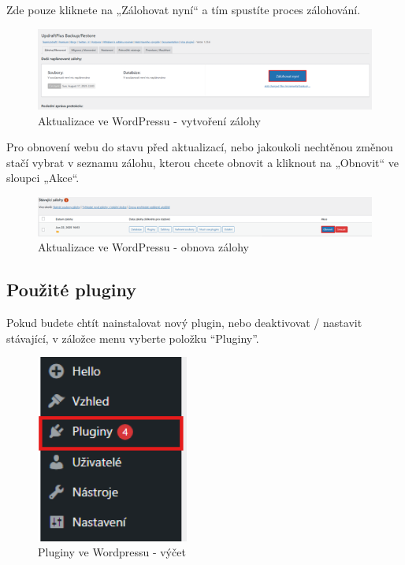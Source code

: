 \documentclass[12pt,a4paper]{article}
\begin{document}
	Zde pouze kliknete na „Zálohovat nyní“ a tím spustíte proces zálohování.
	
	\begin{figure}[htp]
		\centering
		\includegraphics[width=17cm]{WPmakebackup}
		\caption{Aktualizace ve WordPressu - vytvoření zálohy}
		\label{fig:role}
	\end{figure}
	
	Pro obnovení webu do stavu před aktualizací, nebo jakoukoli nechtěnou změnou stačí vybrat v seznamu zálohu, kterou chcete obnovit a kliknout na „Obnovit“ ve sloupci „Akce“.
	
	\begin{figure}[htp]
		\centering
		\includegraphics[width=17cm]{WPrestore}
		\caption{Aktualizace ve WordPressu - obnova zálohy}
		\label{fig:role}
	\end{figure}
	
	\newpage
	\subsection{Použité pluginy}
	Pokud budete chtít nainstalovat nový plugin, nebo deaktivovat / nastavit stávající, v záložce menu vyberte položku “Pluginy”.
			
	\begin{figure}[htp]
		\centering
		\includegraphics[width=5cm]{WPplugins}
		\caption{Pluginy ve Wordpressu - výčet}
		\label{fig:role}
	\end{figure}
	
\end{document}
